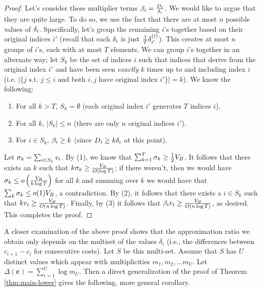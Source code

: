 \documentclass{article}
\newcommand{\CostVector}{\bm{c}}
\begin{document}
\begin{proof}
Let's consider these multiplier terms $\MagicRatio{i} = \frac{\CumulativeBiasDrop{i}}{\BiasDrop{i}}$. We would like to argue that they are quite large. To do so, we use the fact that there are at most $n$ possible values of $\BiasDrop{i}$. Specifically, let's group the remaining $i$'s together based on their original indices $i'$ (recall that each $\BiasDrop{i}$ is just $\tfrac1T \TypedBiasDrop{t}{i'}$). This creates at most $n$ groups of $i$'s, each with at most $T$ elements. We can group $i$'s together in an alternate way; let $S_k$ be the set of indices $i$ such that indices that derive from the original index $i'$ and have been seen \emph{exactly} $k$ times up to and including index $i$ (i.e. $|\{j \mbox{ s.t. } j \leq i \mbox{ and both } i, j \text{ have original index } i'\}| = k$). We know the following:
\begin{enumerate}
  \item For all $k > T$, $S_k = \emptyset$ (each original index $i'$ generates $T$ indices $i$).
  \item For all $k$, $|S_k| \leq n$ (there are only $n$ original indices $i'$).
  \item For $i \in S_k$, $\MagicRatio{i} \ge k$ (since $\CumulativeBiasDrop{i} \ge k \BiasDrop{i}$ at this point).
\end{enumerate}

Let $\sigma_k = \sum_{i \in S_k} \MagicDifference{i}$. By (1), we know that $\sum_{k=1}^T \sigma_k \ge \tfrac12 \CumulativeMagicDifference{B}$. It follows that there exists an $k$ such that $k \sigma_k \geq \frac{\CumulativeMagicDifference{B}}{O(\log T)}$; if there weren't, then we would have $\sigma_k \le o\left(\frac{\CumulativeMagicDifference{B}}{k\log T}\right)$ for all $k$ and summing over $k$ we would have that $\sum_k \sigma_k \leq o(1) \CumulativeMagicDifference{B}$, a contradiction. By (2), it follows that there exists a $i \in S_k$ such that $k \MagicDifference{i} \ge \frac{\CumulativeMagicDifference{B}}{O(n\log T)}$. Finally, by (3) it follows that $\MagicRatio{i} \MagicDifference{i} \geq \frac{\CumulativeMagicDifference{B}}{O(n\log T)}$, as desired. This completes the proof.
\end{proof}

A closer examination of the above proof shows that the approximation ratio we obtain only depends on the multiset of the values $\delta_i$ (i.e., the differences between $c_{i+1} - c_{i}$ for consecutive costs). Let $S$ be this multi-set. Assume that $S$ has $U$ distinct values which appear with multiplicities $m_1, m_2, \dots m_U$. Let $\Delta(\CostVector{}) = \sum_{i=1}^{U} \log m_U$. Then a direct generalization of the proof of Theorem \ref{thm:main-lower} gives the following, more general corollary.
\end{document}
